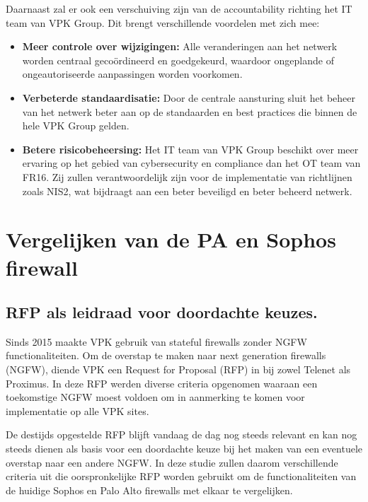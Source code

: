 Daarnaast zal er ook een verschuiving zijn van de accountability richting het IT team van VPK Group. Dit brengt verschillende voordelen met zich mee:

\begin{itemize}
    \item \textbf{Meer controle over wijzigingen:} Alle veranderingen aan het netwerk worden centraal gecoördineerd en goedgekeurd, waardoor ongeplande of ongeautoriseerde aanpassingen worden voorkomen.

    \item \textbf{Verbeterde standaardisatie:} Door de centrale aansturing sluit het beheer van het netwerk beter aan op de standaarden en best practices die binnen de hele VPK Group gelden.
    
    \item \textbf{Betere risicobeheersing: }Het IT team van VPK Group beschikt over meer ervaring op het gebied van cybersecurity en compliance dan het OT team van FR16. Zij zullen verantwoordelijk zijn voor de implementatie van richtlijnen zoals NIS2, wat bijdraagt aan een beter beveiligd en beter beheerd netwerk.
\end{itemize}

\chapter{Vergelijken van de PA en Sophos firewall}


\section{RFP als leidraad voor doordachte keuzes.}
Sinds 2015 maakte VPK gebruik van stateful firewalls zonder NGFW functionaliteiten. Om de overstap te maken naar next generation firewalls (NGFW), diende VPK een Request for Proposal (RFP) in bij zowel Telenet als Proximus. In deze RFP werden diverse criteria opgenomen waaraan een toekomstige NGFW moest voldoen om in aanmerking te komen voor implementatie op alle VPK sites.

De destijds opgestelde RFP blijft vandaag de dag nog steeds relevant en kan nog steeds dienen als basis voor een doordachte keuze bij het maken van een eventuele overstap naar een andere NGFW. In deze studie zullen daarom verschillende criteria uit die oorspronkelijke RFP worden gebruikt om de functionaliteiten van de huidige Sophos en Palo Alto firewalls met elkaar te vergelijken.




